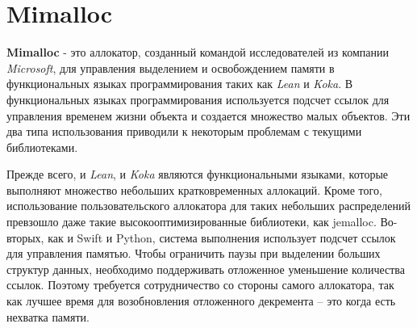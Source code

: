 \section{Mimalloc}
\textbf{Mimalloc} - это аллокатор, созданный командой исследователей из компании \textit{Microsoft}, для управления выделением и освобождением памяти в функциональных языках программирования таких как \textit{Lean} и \textit{Koka}. В функциональных языках программирования используется подсчет ссылок для управления временем жизни объекта и  создается множество малых объектов. Эти два типа использования приводили к некоторым проблемам с текущими библиотеками. \cite{mimalloc-tech-report}

Прежде всего, и \textit{Lean}, и \textit{Koka} являются функциональными языками, которые выполняют множество небольших кратковременных аллокаций. Кроме того, использование пользовательского аллокатора для таких небольших распределений превзошло даже такие высокооптимизированные библиотеки, как jemalloc. Во-вторых, как и Swift и Python, система выполнения использует подсчет ссылок для управления памятью. Чтобы ограничить паузы при выделении больших структур данных, необходимо поддерживать отложенное уменьшение количества ссылок. Поэтому требуется сотрудничество со стороны самого аллокатора, так как лучшее время для возобновления отложенного декремента – это когда есть нехватка памяти.

